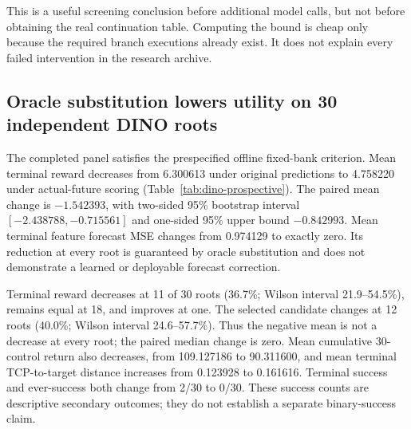 \documentclass[11pt]{article}
\begin{document}
This is a useful screening conclusion before additional model calls, but
not before obtaining the real continuation table. Computing the bound is
cheap only because the required branch executions already exist. It does
not explain every failed intervention in the research archive.

\subsection{Oracle substitution lowers utility on 30 independent DINO roots}
\label{sec:prospective-results}
The completed panel satisfies the prespecified offline fixed-bank criterion.
Mean terminal reward decreases from 6.300613 under original predictions to
4.758220 under actual-future scoring (Table~\ref{tab:dino-prospective}).
The paired mean change is $-1.542393$, with two-sided 95\% bootstrap interval
$[-2.438788,-0.715561]$ and one-sided 95\% upper bound $-0.842993$.
Mean terminal feature forecast MSE changes from 0.974129 to exactly zero.
Its reduction at every root is guaranteed by oracle substitution and does
not demonstrate a learned or deployable forecast correction.

Terminal reward decreases at 11 of 30 roots (36.7\%; Wilson interval
21.9--54.5\%), remains equal at 18, and improves at one. The selected candidate
changes at 12 roots (40.0\%; Wilson interval 24.6--57.7\%). Thus the negative
mean is not a decrease at every root; the paired median change is zero.
Mean cumulative 30-control return also decreases, from 109.127186 to
90.311600, and mean terminal TCP-to-target distance increases from 0.123928
to 0.161616. Terminal success and ever-success both change from 2/30 to 0/30.
These success counts are descriptive secondary outcomes; they do not establish
a separate binary-success claim.
\end{document}
